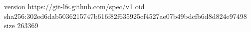 version https://git-lfs.github.com/spec/v1
oid sha256:302ed6dab5036215747b616f82f635925cf4527ae07b49bdcfb6d8d824e97498
size 263369
